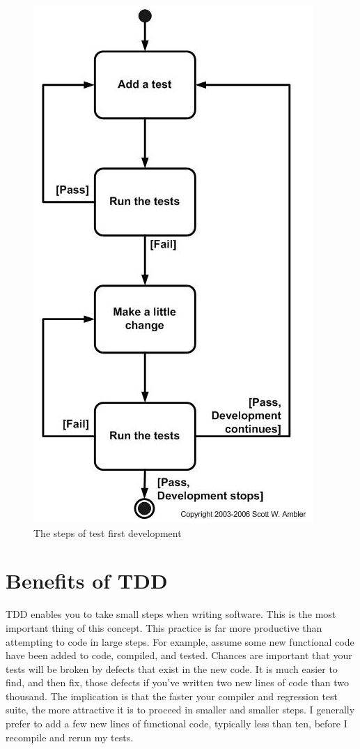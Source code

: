 \documentclass[11pt]{article}
\begin{document}
\begin{figure}[!ht]
\includegraphics[scale=0.8]{TFD.png}
  \caption{The steps of test first development}
\end{figure}

\section{Benefits of TDD}

TDD enables you to take small steps when writing software. This is the most important thing of this concept. This practice is far more productive than attempting to code in large steps. For example, assume some new functional code have been added to code, compiled, and tested. Chances are important that your tests will be broken by defects that exist in the new code. It is much easier to find, and then fix, those defects if you've written two new lines of code than two thousand. The implication is that the faster your compiler and regression test suite, the more attractive it is to proceed in smaller and smaller steps. I generally prefer to add a few new lines of functional code, typically less than ten, before I recompile and rerun my tests.
\end{document}
